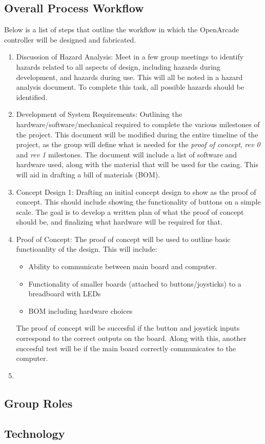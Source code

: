 \documentclass[a4]{article}
\begin{document}
\subsection{Overall Process Workflow}
Below is a list of steps that outline the workflow in which the OpenArcade controller will be designed and fabricated.
\begin{enumerate}
    \item \textcolor{McMasterMaroon}{Discussion of Hazard Analysis}: Meet in a few group meetings to identify hazards related to all aspects of design, including hazards during development, and hazards during use. This will all be noted in a hazard analysis document. To complete this task, all possible hazards should be identified.
    \item \textcolor{McMasterMaroon}{Development of System Requirements}: Outlining the hardware/software/mechanical required to complete the various milestones of the project. This document will be modified during the entire timeline of the project, as the group will define what is needed for the \textit{proof of concept}, \textit{rev 0} and \textit{rev 1} milestones. The document will include a list of software and hardware used, along with the material that will be used for the casing. This will aid in drafting a bill of materials (BOM).
    \item \textcolor{McMasterMaroon}{Concept Design 1}: Drafting an initial concept design to show as the proof of concept. This should include showing the functionality of buttons on a simple scale. The goal is to develop a written plan of what the proof of concept should be, and finalizing what hardware will be required for that.
    \item \textcolor{McMasterMaroon}{Proof of Concept}: The proof of concept will be used to outline basic functioanlity of the design. This will include:
        \begin{itemize}
            \item Ability to communicate between main board and computer.
            \item Functionality of smaller boards (attached to buttons/joysticks) to a breadboard with LEDs
            \item BOM including hardware choices
        \end{itemize}
    The proof of concept will be succesful if the button and joystick inputs correspond to the correct outputs on the board. Along with this, another succesful test will be if the main board correctly communicates to the computer.
    \item 
\end{enumerate}
\subsection{Group Roles}
\subsection{Technology}
\end{document}

